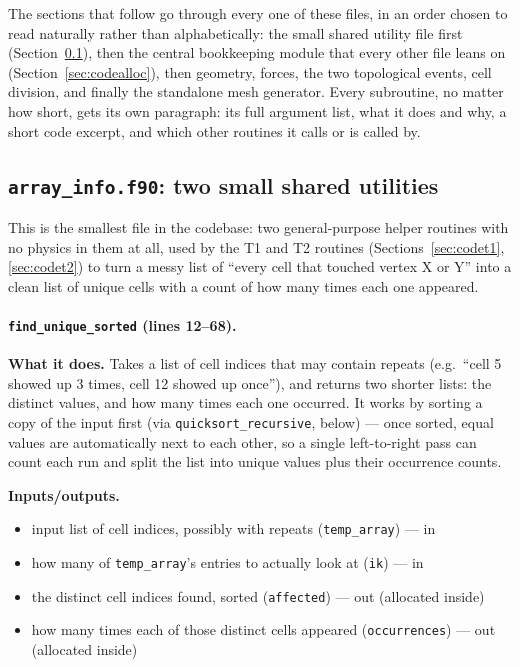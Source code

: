 \documentclass[11pt]{article}
\begin{document}
The sections that follow go through every one of these files, in an order chosen to
read naturally rather than alphabetically: the small shared utility file first
(Section~\ref{sec:codearrayinfo}), then the central bookkeeping module that every other
file leans on (Section~\ref{sec:codealloc}), then geometry, forces, the two topological
events, cell division, and finally the standalone mesh generator. Every subroutine, no
matter how short, gets its own paragraph: its full argument list, what it does and why,
a short code excerpt, and which other routines it calls or is called by.
\subsection{\texttt{array\_info.f90}: two small shared utilities}
\label{sec:codearrayinfo}

This is the smallest file in the codebase: two general-purpose helper routines with no
physics in them at all, used by the T1 and T2 routines (Sections~\ref{sec:codet1},
\ref{sec:codet2}) to turn a messy list of ``every cell that touched vertex X or Y''
into a clean list of unique cells with a count of how many times each one appeared.

\paragraph{\texttt{find\_unique\_sorted} (lines 12--68).}
\textbf{What it does.} Takes a list of cell indices that may contain repeats (e.g.\ ``cell 5
showed up 3 times, cell 12 showed up once''), and returns two shorter lists: the
distinct values, and how many times each one occurred. It works by sorting a copy of
the input first (via \texttt{quicksort\_recursive}, below) --- once sorted, equal values
are automatically next to each other, so a single left-to-right pass can count each run
and split the list into unique values plus their occurrence counts.

\textbf{Inputs/outputs.}
\begin{itemize}[nosep]
  \item input list of cell indices, possibly with repeats (\texttt{temp\_array}) --- in
  \item how many of \texttt{temp\_array}'s entries to actually look at (\texttt{ik}) --- in
  \item the distinct cell indices found, sorted (\texttt{affected}) --- out (allocated inside)
  \item how many times each of those distinct cells appeared (\texttt{occurrences}) --- out (allocated inside)
\end{itemize}
\end{document}
